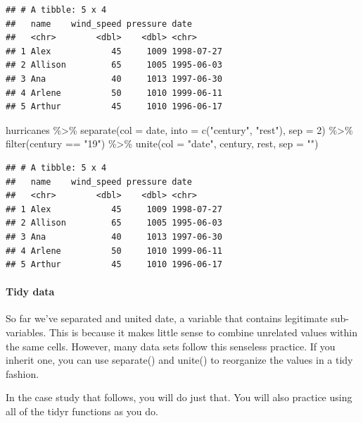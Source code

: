 \documentclass[
]{article}
\newenvironment{Shaded}{\begin{snugshade}}{\end{snugshade}}
\newcommand{\AttributeTok}[1]{\textcolor[rgb]{0.77,0.63,0.00}{#1}}
\newcommand{\DecValTok}[1]{\textcolor[rgb]{0.00,0.00,0.81}{#1}}
\newcommand{\FunctionTok}[1]{\textcolor[rgb]{0.00,0.00,0.00}{#1}}
\newcommand{\NormalTok}[1]{#1}
\newcommand{\SpecialCharTok}[1]{\textcolor[rgb]{0.00,0.00,0.00}{#1}}
\newcommand{\StringTok}[1]{\textcolor[rgb]{0.31,0.60,0.02}{#1}}
\begin{document}
\begin{verbatim}
## # A tibble: 5 x 4
##   name    wind_speed pressure date      
##   <chr>        <dbl>    <dbl> <chr>     
## 1 Alex            45     1009 1998-07-27
## 2 Allison         65     1005 1995-06-03
## 3 Ana             40     1013 1997-06-30
## 4 Arlene          50     1010 1999-06-11
## 5 Arthur          45     1010 1996-06-17
\end{verbatim}

\begin{Shaded}
\begin{Highlighting}[]
\NormalTok{hurricanes }\SpecialCharTok{\%\textgreater{}\%} 
  \FunctionTok{separate}\NormalTok{(}\AttributeTok{col =}\NormalTok{ date, }\AttributeTok{into =} \FunctionTok{c}\NormalTok{(}\StringTok{"century"}\NormalTok{, }\StringTok{"rest"}\NormalTok{), }\AttributeTok{sep =} \DecValTok{2}\NormalTok{) }\SpecialCharTok{\%\textgreater{}\%}
  \FunctionTok{filter}\NormalTok{(century }\SpecialCharTok{==} \StringTok{"19"}\NormalTok{) }\SpecialCharTok{\%\textgreater{}\%}
  \FunctionTok{unite}\NormalTok{(}\AttributeTok{col =} \StringTok{"date"}\NormalTok{, century, rest, }\AttributeTok{sep =} \StringTok{""}\NormalTok{)}
\end{Highlighting}
\end{Shaded}

\begin{verbatim}
## # A tibble: 5 x 4
##   name    wind_speed pressure date      
##   <chr>        <dbl>    <dbl> <chr>     
## 1 Alex            45     1009 1998-07-27
## 2 Allison         65     1005 1995-06-03
## 3 Ana             40     1013 1997-06-30
## 4 Arlene          50     1010 1999-06-11
## 5 Arthur          45     1010 1996-06-17
\end{verbatim}

\hypertarget{tidy-data-2}{%
\paragraph{Tidy data}\label{tidy-data-2}}

So far we've separated and united date, a variable that contains
legitimate sub-variables. This is because it makes little sense to
combine unrelated values within the same cells. However, many data sets
follow this senseless practice. If you inherit one, you can use
separate() and unite() to reorganize the values in a tidy fashion.

In the case study that follows, you will do just that. You will also
practice using all of the tidyr functions as you do.
\end{document}
